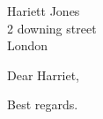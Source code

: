 \documentclass[a4paper,defaultorg,personal]{organisation-letter}
\begin{document}
\begin{letter}{%
        Hariett Jones\\
        2 downing street\\
        London}
\opening{Dear Harriet,}

\lipsum

\closing{Best regards.}
\end{letter}
\end{document}
